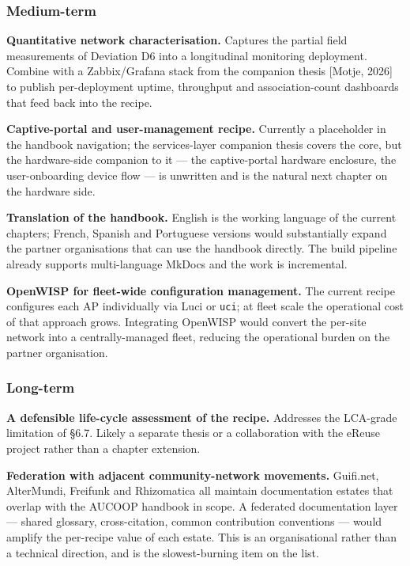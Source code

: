 \hypertarget{medium-term}{%
\subsubsection{Medium-term}\label{medium-term}}

\textbf{Quantitative network characterisation.} Captures the partial
field measurements of Deviation D6 into a longitudinal monitoring
deployment. Combine with a Zabbix/Grafana stack from the companion
thesis {[}Motje, 2026{]} to publish per-deployment uptime, throughput
and association-count dashboards that feed back into the recipe.

\textbf{Captive-portal and user-management recipe.} Currently a
placeholder in the handbook navigation; the services-layer companion
thesis covers the core, but the hardware-side companion to it --- the
captive-portal hardware enclosure, the user-onboarding device flow ---
is unwritten and is the natural next chapter on the hardware side.

\textbf{Translation of the handbook.} English is the working language of
the current chapters; French, Spanish and Portuguese versions would
substantially expand the partner organisations that can use the handbook
directly. The build pipeline already supports multi-language MkDocs and
the work is incremental.

\textbf{OpenWISP for fleet-wide configuration management.} The current
recipe configures each AP individually via Luci or \texttt{uci}; at
fleet scale the operational cost of that approach grows. Integrating
OpenWISP would convert the per-site network into a centrally-managed
fleet, reducing the operational burden on the partner organisation.

\hypertarget{long-term}{%
\subsubsection{Long-term}\label{long-term}}

\textbf{A defensible life-cycle assessment of the recipe.} Addresses the
LCA-grade limitation of §6.7. Likely a separate thesis or a
collaboration with the eReuse project rather than a chapter extension.

\textbf{Federation with adjacent community-network movements.}
Guifi.net, AlterMundi, Freifunk and Rhizomatica all maintain
documentation estates that overlap with the AUCOOP handbook in scope. A
federated documentation layer --- shared glossary, cross-citation,
common contribution conventions --- would amplify the per-recipe value
of each estate. This is an organisational rather than a technical
direction, and is the slowest-burning item on the list.

